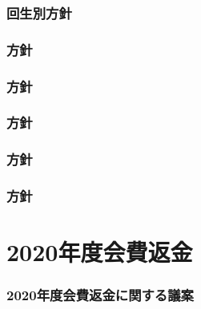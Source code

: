 \section{回生別方針}




\section{\kaikeiDepartment{}方針}

\section{\kensuiDepartment{}方針}

\section{\syogaiDepartment{}方針}

\section{\systemDepartment{}方針}

\section{\soumuDepartment{}方針}


\newpage
\part{2020年度会費返金}
\section{2020年度会費返金に関する議案}

